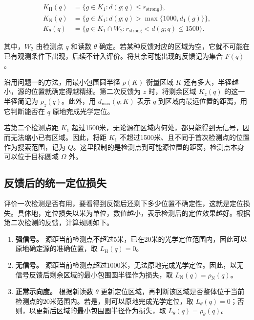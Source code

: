 \begin{equation}
\begin{aligned}
K_{\mathrm H}(q)&=\{g\in K_1:d(g;q)\le r_{\mathrm{strong}}\},\\
K_{\mathrm N}(q)&=\{g\in K_1:d(g;q)>\max\{1000,d_1(g)\}\},\\
K_\theta(q)&=\{g\in K_1\cap W_2:r_{\mathrm{strong}}<d(g;q)\le1500\}.
\end{aligned}
\label{eq:q2-pair-regions}
\end{equation}

其中，\(W_2\) 由检测点 \(q\) 和读数 \(\theta\) 确定。若某种反馈对应的区域为空，它就不可能在已有观测条件下出现，后续不计入评价。将其余可能出现的反馈记为集合 \(F(q)\)。

沿用问题一的方法，用最小包围圆半径 \(\rho(K)\) 衡量区域 \(K\) 还有多大，半径越小，源的位置就确定得越精细。第二次反馈为 \(z\) 时，将剩余区域 \(K_z(q)\) 的这一半径简记为 \(\rho_z(q)\)。此外，用 \(d_{\max}(q;K)\) 表示 \(q\) 到区域内最远位置的距离，用它判断能否在 \(q\) 原地完成光学定位。

若第二个检测点距 \(K_1\) 超过1500米，无论源在区域内何处，都只能得到无信号，因而无法缩小已有区域。因此，将距 \(K_1\) 不超过1500米、且不同于首次检测点的位置作为搜索范围，记为 \(Q\)。这里限制的是检测点到可能源位置的距离，检测点本身可以位于目标圆域 \(\Omega\) 外。

\subsection{反馈后的统一定位损失}

评价一次检测是否有用，要看得到反馈后还剩下多少位置不确定性，这就是定位损失。具体地，定位损失以米为单位，数值越小，表示检测后的定位效果越好。根据第二次检测的反馈，计算规则如下。

\begin{enumerate}[label=(\arabic*),leftmargin=2.2em]
  \item \textbf{强信号。} 源距当前检测点不超过5米，已在20米的光学定位范围内，因此可以原地确定源的准确位置，取 \(L_{\mathrm H}(q)=0\)。
  \item \textbf{无信号。} 源距当前检测点超过1000米，无法原地完成光学定位。因此，以无信号反馈后剩余区域的最小包围圆半径作为损失，取 \(L_{\mathrm N}(q)=\rho_{\mathrm N}(q)\)。
  \item \textbf{正常示向度。} 根据新读数 \(\theta\) 更新定位区域，再判断该区域是否整体位于当前检测点的20米范围内。若是，则可以原地完成光学定位，取 \(L_\theta(q)=0\)；否则，以更新后区域的最小包围圆半径作为损失，取 \(L_\theta(q)=\rho_\theta(q)\)。
\end{enumerate}

